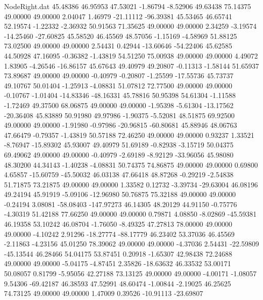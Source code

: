 \begin{filecontents}{NodeRight.dat}
  45.48386   46.95953   47.53021    -1.86794   -8.52906   49.63438   75.14375   49.00000   49.00000    2.04047    1.46979  -21.11112  -96.39381
  45.53465   46.65741   52.19574    -1.22332   -2.36932   50.91563   71.35625   49.00000   49.00000    2.34259   -3.19574  -14.25460  -27.60825
  45.58520   46.45569   48.57056    -1.15169   -4.58969   51.88125   73.02500   49.00000   49.00000    2.54431    0.42944  -13.60646  -54.22406
  45.62585   44.50928   47.16095    -0.36382   -1.43819   54.51250   75.00938   49.00000   49.00000    4.49072    1.83905   -4.26546  -16.86157
  45.67643   49.40979   49.20807    -0.11313   -1.58144   51.65937   73.89687   49.00000   49.00000   -0.40979   -0.20807   -1.25599  -17.55736
  45.73737   49.10767   50.01404    -1.25913   -4.08831   51.07812   72.77500   49.00000   49.00000   -0.10767   -1.01404  -14.83346  -48.16331
  45.78816   50.95398   54.61304    -1.11588   -1.72469   49.37500   68.06875   49.00000   49.00000   -1.95398   -5.61304  -13.17562  -20.36408
  45.83889   50.91980   49.97986    -1.90375   -5.52081   48.51875   69.92500   49.00000   49.00000   -1.91980   -0.97986  -20.96815  -60.80681
  45.88946   48.06763   47.66479    -0.79357   -1.43819   50.57188   72.46250   49.00000   49.00000    0.93237    1.33521   -8.76947  -15.89302
  45.93007   49.40979   51.69189    -0.82938   -3.15719   50.04375   69.49062   49.00000   49.00000   -0.40979   -2.69189   -8.92129  -33.96056
  45.98080   48.30200   44.34143    -1.40238   -4.08831   50.74375   74.86875   49.00000   49.00000    0.69800    4.65857  -15.60759  -45.50032
  46.03138   47.66418   48.87268    -0.29219   -2.54838   51.71875   73.21875   49.00000   49.00000    1.33582    0.12732   -3.39734  -29.63004
  46.08196   49.24194   45.91919    -5.09106  -12.96980   50.76875   75.32188   49.00000   49.00000   -0.24194    3.08081  -58.08403 -147.97273
  46.14305   48.20129   44.91150    -0.75776   -4.30319   51.42188   77.66250   49.00000   49.00000    0.79871    4.08850   -8.02869  -45.59381
  46.19358   53.10242   46.08704    -1.76050   -8.49325   47.27813   78.00000   49.00000   49.00000   -4.10242    2.91296  -18.27774  -88.17779
  46.23402   53.37036   46.45569    -2.11863   -4.23156   45.01250   78.39062   49.00000   49.00000   -4.37036    2.54431  -22.59809  -45.13544
  46.28466   54.04175   53.87451     0.20918   -1.65307   42.98438   72.24688   49.00000   49.00000   -5.04175   -4.87451    2.35826  -18.63632
  46.33532   53.00171   50.08057     0.81799   -5.95056   42.27188   73.13125   49.00000   49.00000   -4.00171   -1.08057    9.54306  -69.42187
  46.38593   47.52991   48.60474    -1.00844   -2.19025   46.25625   74.73125   49.00000   49.00000    1.47009    0.39526  -10.91113  -23.69807

\end{filecontents}
